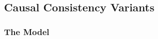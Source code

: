 
\subsection{Causal Consistency Variants} \label{ss:cc-variants}

\subsubsection{The \alloystar{} Model} \label{sss:cc-alloystar}

\subsubsection{\taskchecking} \label{sss:cc-taskchecking}

\subsubsection{\taskgenerating} \label{sss:cc-taskgenerating}

\subsubsection{\taskcomparing} \label{sss:cc-taskcomparing}

